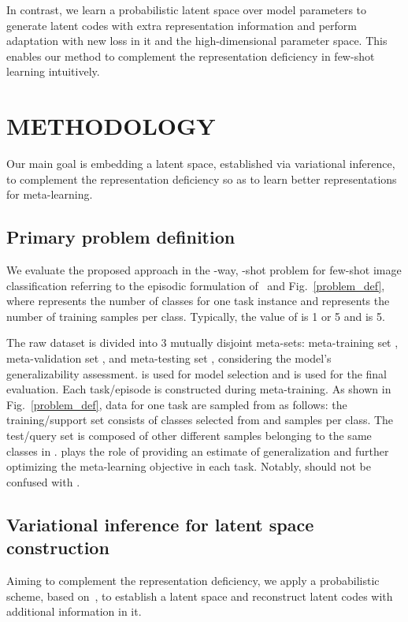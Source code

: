 \documentclass[10pt,conference,a4paper]{IEEEtran}
\begin{document}
In contrast, we learn a probabilistic latent space over model parameters to generate latent codes with extra representation information and perform adaptation with new loss in it and the high-dimensional parameter space. This enables our method to complement the representation deficiency in few-shot learning intuitively.

\section{METHODOLOGY}
\label{sectionMETHODOLOGY}
Our main goal is embedding a latent space, established via variational inference, to complement the representation deficiency so as to learn better representations for meta-learning.

\subsection{Primary problem definition}
We evaluate the proposed approach in the -way, -shot problem for few-shot image classification referring to the episodic formulation of~\cite{vinyals2016matching} and Fig.~\ref{problem_def}, where  represents the number of classes for one task instance and  represents the number of training samples per class. Typically, the value of  is 1 or 5 and  is 5.

The raw dataset is divided into 3 mutually disjoint meta-sets: meta-training set , meta-validation set , and meta-testing set , considering the model's generalizability assessment.  is used for model selection and  is used for the final evaluation. Each task/episode is constructed during meta-training. As shown in Fig.~\ref{problem_def}, data for one task  are sampled from  as follows: the training/support set  consists of  classes selected from  and  samples per class. The test/query set  is composed of other different samples belonging to the same classes in .  plays the role of providing an estimate of generalization and further optimizing the meta-learning objective in each task. Notably,  should not be confused with .

\subsection{Variational inference for latent space construction}
Aiming to complement the representation deficiency, we apply a probabilistic scheme, based on~\cite{kingma2014auto-encoding}, to establish a latent space and reconstruct latent codes with additional information in it.
\end{document}
